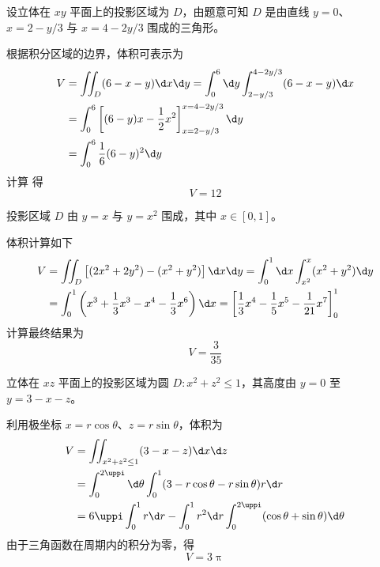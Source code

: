 \begin{solution}
     设立体在 $xy$ 平面上的投影区域为 $D$，由题意可知 $D$ 是由直线 $y=0$、$x = 2 - y/3$ 与 $x = 4 - 2y/3$ 围成的三角形。

    根据积分区域的边界，体积可表示为
    \begin{equation}
        \begin{aligned}
            V & = \iint_D (6 - x - y) \d x \d y = \int_0^6 \d y \int_{2 - y/3}^{4 - 2y/3} (6 - x - y) \d x \\
              & = \int_0^6 \left[ (6 - y)x - \frac{1}{2}x^2 \right]_{x=2-y/3}^{x=4-2y/3} \d y              \\
              & = \int_0^6 \frac{1}{6}(6 - y)^2 \d y \label{eq:v1-step}
        \end{aligned}
    \end{equation}
    计算  得
    \begin{equation}
        V = \boxed{12}
    \end{equation}

     投影区域 $D$ 由 $y = x$ 与 $y = x^2$ 围成，其中 $x \in [0, 1]$。

    体积计算如下
    \begin{equation}
        \begin{aligned}
            V & = \iint_D \left[ (2x^2 + 2y^2) - (x^2 + y^2) \right] \d x \d y = \int_0^1 \d x \int_{x^2}^x (x^2 + y^2) \d y                                      \\
              & = \int_0^1 \left( x^3 + \frac{1}{3}x^3 - x^4 - \frac{1}{3}x^6 \right) \d x = \left[ \frac{1}{3}x^4 - \frac{1}{5}x^5 - \frac{1}{21}x^7 \right]_0^1
        \end{aligned}
    \end{equation}
    计算最终结果为
    \begin{equation}
        V = \boxed{\frac{3}{35}}
    \end{equation}

     立体在 $xz$ 平面上的投影区域为圆 $D \colon x^2 + z^2 \le 1$，其高度由 $y=0$ 至 $y = 3 - x - z$。

    利用极坐标 $x = r \cos \theta$、$z = r \sin \theta$，体积为
    \begin{equation}
        \begin{aligned}
            V & = \iint_{x^2+z^2 \le 1} (3 - x - z) \d x \d z                                                      \\
              & = \int_0^{2\uppi} \d \theta \int_0^1 (3 - r \cos \theta - r \sin \theta) r \d r                    \\
              & = 6\uppi \int_0^1 r \d r - \int_0^1 r^2 \d r \int_0^{2\uppi} (\cos \theta + \sin \theta) \d \theta
        \end{aligned}
    \end{equation}
    由于三角函数在周期内的积分为零，得
    \begin{equation}
        V = \boxed{3\uppi}
    \end{equation}


\end{solution}
